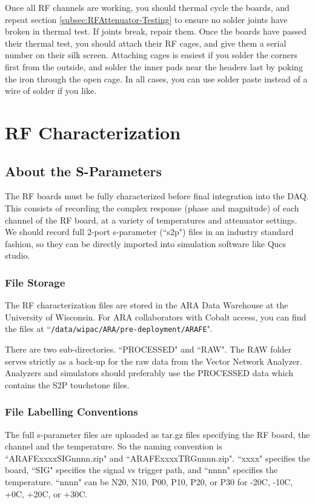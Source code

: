 \documentclass[letter,12pt]{article}
\begin{document}
Once all RF channels are working, you should thermal cycle the boards, and repeat section \ref{subsec:RFAttenuator-Testing} to ensure no solder joints have broken in thermal test. If joints break, repair them. Once the boards have passed their thermal test, you should attach their RF cages, and give them a serial number on their silk screen. Attaching cages is easiest if you solder the corners first from the outside, and solder the inner pads near the headers last by poking the iron through the open cage. In all cases, you can use solder paste instead of a wire of solder if you like.

\section{RF Characterization}

\subsection{About the S-Parameters}
The RF boards must be fully characterized before final integration into the DAQ. This consists of recording the complex response (phase and magnitude) of each channel of the RF board, at a variety of temperatures and attenuator settings. We should record full 2-port s-parameter (``s2p") files in an industry standard fashion, so they can be directly imported into simulation software like Qucs studio.

 \subsubsection{File Storage}
The RF characterization files are stored in the ARA Data Warehouse at the University of Wisconsin. For ARA collaborators with Cobalt access, you can find the files at ``\texttt{/data/wipac/ARA/pre-deployment/ARAFE}".

There are two sub-directories. ``PROCESSED" and ``RAW". The RAW folder serves strictly as a back-up for the raw data from the Vector Network Analyzer. Analyzers and simulators should preferably use the PROCESSED data which contains the S2P touchstone files.

\subsubsection{File Labelling Conventions}
The full s-parameter files are uploaded as tar.gz files specifying the RF board, the channel and the temperature. So the naming convention is ``ARAFExxxxSIGnnnn.zip" and ``ARAFExxxxTRGnnnn.zip". ``xxxx" specifies the board, ``SIG" specifies the signal vs trigger path, and ``nnnn" specifies the temperature. ``nnnn" can be N20, N10, P00, P10, P20, or P30 for -20C, -10C, +0C, +20C, or +30C.
\end{document}
